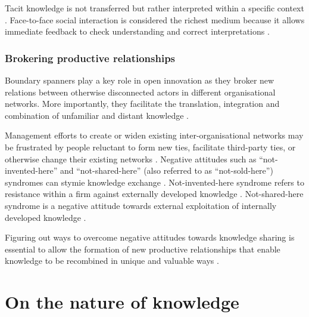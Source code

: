 Tacit knowledge is not transferred but rather interpreted within a specific context \citep{nonaka1995knowledge,duguid2005art,marabelli2014knowing}. Face-to-face social interaction is considered the richest medium because it allows immediate feedback to check understanding and correct interpretations \citep{koskinen2003tacit}. \medskip

\subsubsection{Brokering productive relationships}

Boundary spanners play a key role in open innovation as they broker new relations between otherwise disconnected actors in different organisational networks. More importantly, they facilitate the translation, integration and combination of unfamiliar and distant knowledge \citep{granovetter1973strength,tushman1981boundary,allen1984managing,szulanski2003sticky,burt2004structural,burt2007secondhand,seidler2008use,meyer2010rise,chesbrough2012open}. \medskip

Management efforts to create or widen existing inter-organisational networks may be frustrated by people reluctant to form new ties, facilitate third-party ties, or otherwise change their existing networks \citep{davis2010agency}. Negative attitudes such as \enquote{not-invented-here} and \enquote{not-shared-here} (also referred to as \enquote{not-sold-here}) syndromes can stymie knowledge exchange \citep{lichtenthaler2006attitudes,lichtenthaler2011your,de2014neither,podmetina2015skills,chesbrough2017future}. Not-invented-here syndrome refers to resistance within a firm against externally developed knowledge \citep{katz1982investigating,hussinger2011search,antons2015opening}. Not-shared-here syndrome is a negative attitude towards external exploitation of internally developed knowledge \citep{chesbrough2003open,lichtenthaler2006attitudes,de2014neither}. \medskip

Figuring out ways to overcome negative attitudes towards knowledge sharing is essential to allow the formation of new productive relationships that enable knowledge to be recombined in unique and valuable ways \citep{uzzi1997social,nahapiet1998social,obstfeld2005social,lane2006reification,davis2010agency,meyer2010rise}.\medskip

\section{On the nature of knowledge}

